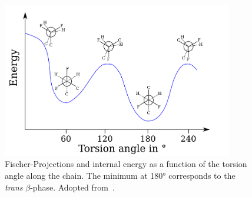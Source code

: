 \begin{figure}
\centering
	\includegraphics[width=0.9\textwidth]{./figs/chap1/fischerproject}
	\caption[Fischer-Projections and internal energy as a function of the torsion angle along the chain. The minimum at \ang{180} corresponds to the \emph{trans} $\beta$-phase.]{Fischer-Projections and internal energy as a function of the torsion angle along the chain. The minimum at \ang{180} corresponds to the \emph{trans} $\beta$-phase. Adopted from~\cite[p. 809]{encyclopedia}.}
	\label{fig:pvfischer}
\end{figure}
